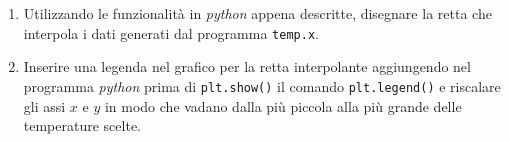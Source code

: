 \documentclass[11pt]{article}
\begin{document}
\begin{enumerate}
  \item Utilizzando le funzionalit\`a in {\it python\/} appena descritte, disegnare la retta che interpola i dati generati dal programma \texttt{temp.x}.
\item 
Inserire una legenda nel grafico per la retta interpolante aggiungendo nel programma \textit{python} prima di 
\lstinline[language=python]!plt.show()! 
il comando \lstinline[language=python]!plt.legend()! e riscalare gli assi $x$ e $y$ in modo che vadano dalla pi\`u piccola alla pi\`u grande delle temperature scelte. 
\end{enumerate}  
\end{document}
